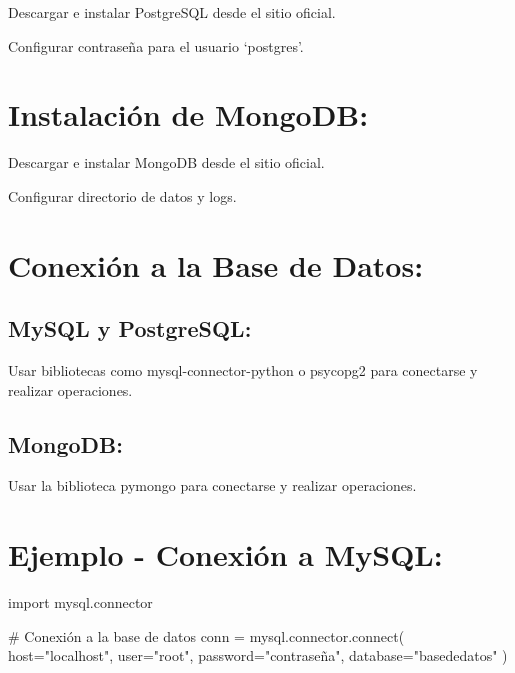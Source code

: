 \documentclass[
  a4paper,
  DIV=11,
  numbers=noendperiod,
  onepage,
  openany]{scrreprt}
\newenvironment{Shaded}{\begin{snugshade}}{\end{snugshade}}
\newcommand{\CommentTok}[1]{\textcolor[rgb]{0.37,0.37,0.37}{#1}}
\newcommand{\ExtensionTok}[1]{\textcolor[rgb]{0.00,0.23,0.31}{#1}}
\newcommand{\ImportTok}[1]{\textcolor[rgb]{0.00,0.46,0.62}{#1}}
\newcommand{\NormalTok}[1]{\textcolor[rgb]{0.00,0.23,0.31}{#1}}
\newcommand{\OperatorTok}[1]{\textcolor[rgb]{0.37,0.37,0.37}{#1}}
\newcommand{\StringTok}[1]{\textcolor[rgb]{0.13,0.47,0.30}{#1}}
\begin{document}
Descargar e instalar PostgreSQL desde el sitio oficial.

Configurar contraseña para el usuario `postgres'.

\section{Instalación de MongoDB:}\label{instalaciuxf3n-de-mongodb}

Descargar e instalar MongoDB desde el sitio oficial.

Configurar directorio de datos y logs.

\section{Conexión a la Base de
Datos:}\label{conexiuxf3n-a-la-base-de-datos}

\subsection{MySQL y PostgreSQL:}\label{mysql-y-postgresql}

Usar bibliotecas como mysql-connector-python o psycopg2 para conectarse
y realizar operaciones.

\subsection{MongoDB:}\label{mongodb}

Usar la biblioteca pymongo para conectarse y realizar operaciones.

\section{Ejemplo - Conexión a
MySQL:}\label{ejemplo---conexiuxf3n-a-mysql}

\begin{Shaded}
\begin{Highlighting}[]
\ImportTok{import}\NormalTok{ mysql.connector}

\CommentTok{\# Conexión a la base de datos}
\NormalTok{conn }\OperatorTok{=}\NormalTok{ mysql.connector.}\ExtensionTok{connect}\NormalTok{(}
\NormalTok{    host}\OperatorTok{=}\StringTok{"localhost"}\NormalTok{,}
\NormalTok{    user}\OperatorTok{=}\StringTok{"root"}\NormalTok{,}
\NormalTok{    password}\OperatorTok{=}\StringTok{"contraseña"}\NormalTok{,}
\NormalTok{    database}\OperatorTok{=}\StringTok{"basededatos"}
\NormalTok{)}
\end{Highlighting}
\end{Shaded}
\end{document}
